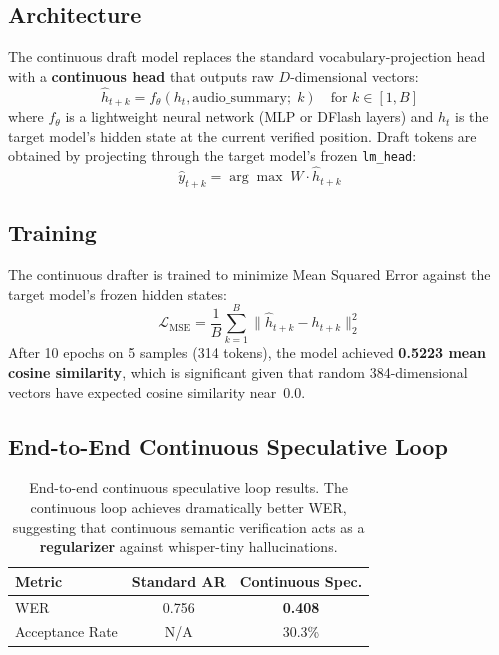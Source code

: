 \documentclass[11pt,a4paper]{article}
\begin{document}
\subsection{Architecture}
The continuous draft model replaces the standard vocabulary-projection head with a \textbf{continuous head} that outputs raw $D$-dimensional vectors:
\begin{equation}
    \hat{h}_{t+k} = f_\theta(h_t, \text{audio\_summary};\; k) \quad \text{for } k \in [1, B]
\end{equation}
where $f_\theta$ is a lightweight neural network (MLP or DFlash layers) and $h_t$ is the target model's hidden state at the current verified position.
Draft tokens are obtained by projecting through the target model's frozen \texttt{lm\_head}:
\begin{equation}
    \hat{y}_{t+k} = \arg\max\; W \cdot \hat{h}_{t+k}
\end{equation}

\subsection{Training}
The continuous drafter is trained to minimize Mean Squared Error against the target model's frozen hidden states:
\begin{equation}
    \mathcal{L}_{\mathrm{MSE}} = \frac{1}{B}\sum_{k=1}^{B} \|\hat{h}_{t+k} - h_{t+k}\|_2^2
\end{equation}
After 10 epochs on 5 samples (314 tokens), the model achieved \textbf{0.5223 mean cosine similarity}, which is significant given that random 384-dimensional vectors have expected cosine similarity near~0.0.

\subsection{End-to-End Continuous Speculative Loop}

\begin{table}[H]
\centering
\small
\begin{tabular}{@{}lcc@{}}
\toprule
\textbf{Metric} & \textbf{Standard AR} & \textbf{Continuous Spec.} \\
\midrule
WER & 0.756 & \textbf{0.408} \\
Acceptance Rate & N/A & 30.3\% \\
\bottomrule
\end{tabular}
\caption{End-to-end continuous speculative loop results.
The continuous loop achieves dramatically better WER, suggesting that continuous semantic verification acts as a \textbf{regularizer} against whisper-tiny hallucinations.}
\label{tab:e2e}
\end{table}
\end{document}
